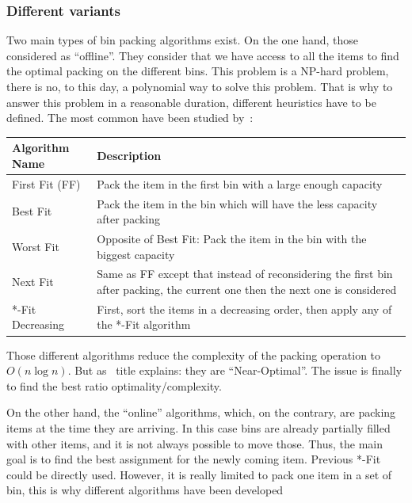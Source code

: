 \subsubsection{Different variants}

Two main types of bin packing algorithms exist. On the one hand, those
considered as “offline”. They consider that we have access to all the items to
find the optimal packing on the different bins. This problem is a NP-hard
problem, there is no, to this day, a polynomial way to solve this problem.
That is why to answer this problem in a reasonable duration, different
heuristics have to be defined. The most common have been studied
by~\cite*{mathsBpheuristics}:

\vspace{1em}
\begin{center}
	\begin{tabular}{| l | p{7cm} |}
		\hline
		Algorithm Name & Description \\
		\hline
		First Fit (FF) & Pack the item in the first bin with a large enough capacity \\
		\hline
		Best Fit & Pack the item in the bin which will have the less capacity after packing \\
		\hline
		Worst Fit & Opposite of Best Fit: Pack the item in the bin with the biggest capacity \\
		\hline
		Next Fit & Same as FF except that instead of reconsidering the first bin after packing, the current one then the next one is considered \\
		\hline
		*-Fit Decreasing & First, sort the items in a decreasing order, then apply any of the *-Fit algorithm \\
		\hline
	\end{tabular}
\end{center}
\vspace{1em}

Those different algorithms reduce the complexity of the packing operation to
$O(n\log{n})$. But as~\cite{mathsBpheuristics} title explains: they are
“Near-Optimal”. The issue is finally to find the best ratio optimality/complexity.

On the other hand, the “online” algorithms, which, on the contrary, are packing
items at the time they are arriving. In this case bins are already partially
filled with other items, and it is not always possible to move those. Thus, the
main goal is to find the best assignment for the newly coming item. Previous
*-Fit could be directly used. However, it is really limited to pack one item in
a set of bin, this is why different algorithms have been developed

